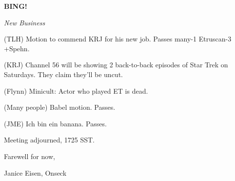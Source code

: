 \documentclass[12pt]{article}
\newcommand{\bing}{{\bf BING!} }
\newcommand{\goto}[1]{\bing \vskip 12pt \centerline{{\em{#1}}}}
\begin{document}
\goto{New Business}

(TLH) Motion to commend KRJ for his new job. Passes many-1 Etruscan-3 +Spehn.

(KRJ) Channel 56 will be showing 2 back-to-back episodes of Star Trek on Saturdays. They claim they'll be uncut.

(Flynn) Minicult: Actor who played ET is dead.

(Many people) Babel motion. Passes.

(JME) Ich bin ein banana. Passes.

\vspace{12pt}

\noindent
Meeting adjourned, 1725 SST.

\vspace{18pt}

\centerline{Farewell for now,}
\centerline{Janice Eisen, Onseck}
\end{document}
